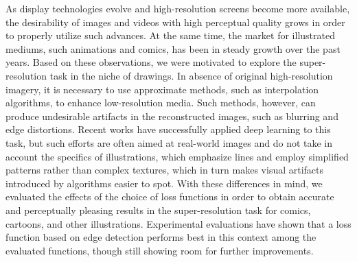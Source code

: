 As display technologies evolve and high-resolution screens become more available, the desirability of images and videos with high perceptual quality grows in order to properly utilize such advances. At the same time, the market for illustrated mediums, such animations and comics, has been in steady growth over the past years. Based on these observations, we were motivated to explore the super-resolution task in the niche of drawings. In absence of original high-resolution imagery, it is necessary to use approximate methods, such as interpolation algorithms, to enhance low-resolution media. Such methods, however, can produce undesirable artifacts in the reconstructed images, such as blurring and edge distortions. Recent works have successfully applied deep learning to this task, but such efforts are often aimed at real-world images and do not take in account the specifics of illustrations, which emphasize lines and employ simplified patterns rather than complex textures, which in turn makes visual artifacts introduced by algorithms easier to spot. With these differences in mind, we evaluated the effects of the choice of loss functions in order to obtain accurate and perceptually pleasing results in the super-resolution task for comics, cartoons, and other illustrations. Experimental evaluations have shown that a loss function based on edge detection performs best in this context among the evaluated functions, though still showing room for further improvements.

